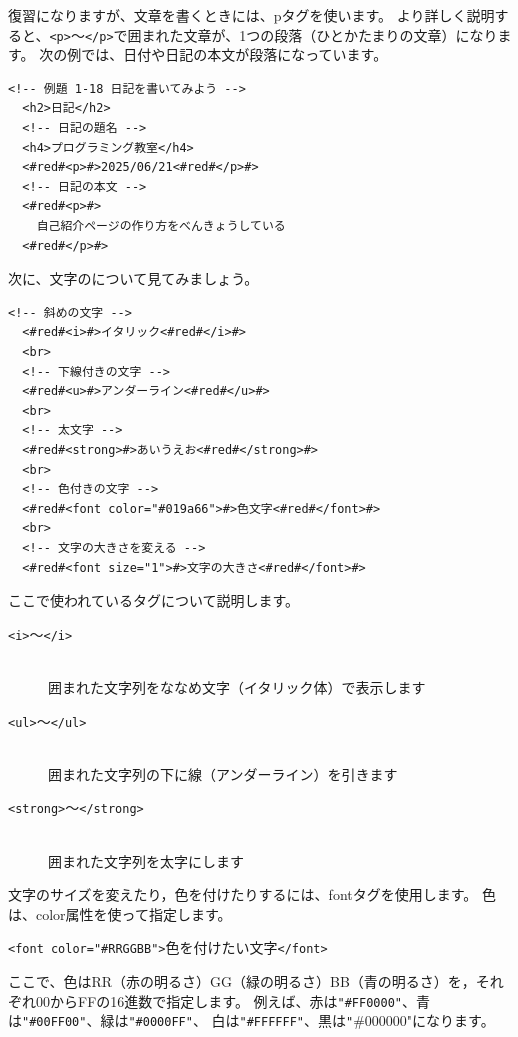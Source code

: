 復習になりますが、文章を書くときには、pタグを使います。
より詳しく説明すると、\texttt{<p>}～\texttt{</p>}で囲まれた文章が、1つの段落（ひとかたまりの文章）になります。
次の例では、日付や日記の本文が段落になっています。
\bigskip

\noindent%
\begin{lstlisting}[caption=段落の例,label=pwdtest,firstnumber=1]
  <!-- 例題 1-18 日記を書いてみよう -->
  <h2>日記</h2>
  <!-- 日記の題名 -->
  <h4>プログラミング教室</h4>
  <#red#<p>#>2025/06/21<#red#</p>#>
  <!-- 日記の本文 -->
  <#red#<p>#>
    自己紹介ページの作り方をべんきょうしている
  <#red#</p>#>
\end{lstlisting}

次に、文字のについて見てみましょう。
\bigskip

\noindent%
\begin{lstlisting}[caption=文字の\ruby{装飾}{そうしょく},label=pwdtest,firstnumber=1]
  <!-- 斜めの文字 -->
  <#red#<i>#>イタリック<#red#</i>#>
  <br>
  <!-- 下線付きの文字 -->
  <#red#<u>#>アンダーライン<#red#</u>#>
  <br>
  <!-- 太文字 -->
  <#red#<strong>#>あいうえお<#red#</strong>#>
  <br>
  <!-- 色付きの文字 -->
  <#red#<font color="#019a66">#>色文字<#red#</font>#>	
  <br>
  <!-- 文字の大きさを変える -->
  <#red#<font size="1">#>文字の大きさ<#red#</font>#>
\end{lstlisting}


ここで使われているタグについて説明します。

\begin{description}
  \item[\texttt{<i>}～\texttt{</i>}]\mbox{}\\
  囲まれた文字列をななめ文字（イタリック体）で表示します
  \item[\texttt{<ul>}～\texttt{</ul>}] \mbox{}\\
  囲まれた文字列の下に線（アンダーライン）を引きます
  \item[\texttt{<strong>}～\texttt{</strong>}] \mbox{}\\
  囲まれた文字列を太字にします
\end{description}

\noindent%
文字のサイズを変えたり，色を付けたりするには、fontタグを使用します。
色は、color属性を使って指定します。
\bigskip

\texttt{<font color="\#RRGGBB">}色を付けたい文字\texttt{</font>}\\
\bigskip

\noindent%
ここで、色はRR（赤の明るさ）GG（緑の明るさ）BB（青の明るさ）を，それぞれ00からFFの16進数で指定します。
例えば、赤は\texttt{"\#FF0000"}、青は\texttt{"\#00FF00"}、緑は\texttt{"\#0000FF"}、
白は\texttt{"\#FFFFFF"}、黒は\texttt"{\#000000"}になります。

